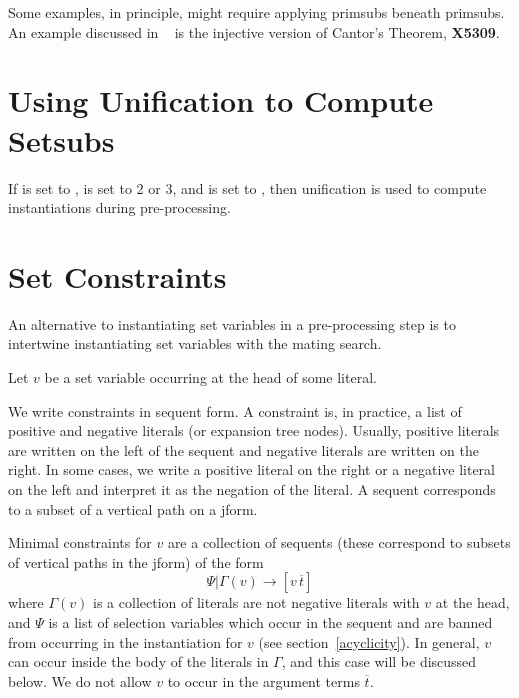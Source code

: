 Some examples, in principle, might require applying primsubs
beneath primsubs.  An example discussed in ~\cite{Andrews00a}
is the injective version of Cantor's Theorem, {\bf X5309}.

\section{Using Unification to Compute Setsubs}\label{setvars:pr00}

If  is set to ,
 is set to 2 or 3, and
 is set to ,
then unification is used to compute instantiations
during pre-processing.

\section{Set Constraints}\label{setvars:constraints}

An alternative to instantiating set variables in a pre-processing
step is to intertwine instantiating set variables with the mating search.


Let $v$ be a set variable occurring at the head of some literal.

We write constraints in sequent form.  A constraint is, in practice,
a list of positive and negative literals (or expansion tree nodes).
Usually, positive literals are written on the left of the sequent and negative
literals are written on the right.  In some cases, we write
a positive literal on the right or a negative literal on the left 
and interpret it as the negation of the literal.
A sequent corresponds to a subset of a vertical path on a jform.

Minimal constraints for $v$ are a collection of sequents (these correspond
to subsets of vertical paths in the jform) of the form
$$\Psi | \Gamma(v)\rightarrow [v\, \overline{t}]$$
where $\Gamma(v)$ is a collection of literals 
are not negative literals with $v$ at the head,
and $\Psi$ is a list of selection variables which occur
in the sequent and are banned from occurring in the instantiation
for $v$ (see section~\ref{acyclicity}).
In general, $v$ can occur inside the body of the
literals in $\Gamma$, and this case will be discussed below.
We do not allow $v$ to occur in the argument terms $\overline{t}$.

